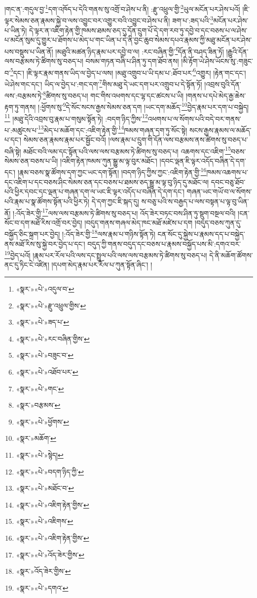 །གང་ན་:གདུལ་བྱ་\footnote{«སྣར་»«པེ་»འདུལ་བ་}དག་འཁོད་པ་དེའི་གནས་སུ་འགྲོ་བ་ཤེས་པ་ནི། :རྫུ་འཕྲུལ་གྱི་\footnote{«སྣར་»«པེ་»རྫུ་འཕྲུལ་གྱིས་}ཡུལ་མངོན་པར་ཤེས་པའོ། །ཇི་ལྟར་སེམས་ཅན་རྣམས་སྐྱེ་བ་ལས་འབྱུང་བར་འགྱུར་བའི་འབྱུང་བ་ཤེས་པ་ནི། ཟག་པ་:ཟད་པའི་\footnote{«སྣར་»«པེ་»ཟད་པ་}མངོན་པར་ཤེས་པ་ཡིན་ཏེ། དེ་ལྟར་ན་འཇིག་རྟེན་གྱི་ཁམས་ཐམས་ཅད་དུ་དོན་དྲུག་པོ་དེ་དག་རབ་ཏུ་དབྱེ་བ་དང་བཅས་པ་ལ་ཤེས་པ་མངོན་སུམ་དུ་གྱུར་པ་ཐོགས་པ་མེད་པ་གང་ཡིན་པ་དེ་ནི་བྱང་ཆུབ་སེམས་དཔའ་རྣམས་ཀྱི་མཐུ་མངོན་པར་ཤེས་པས་བསྡུས་པ་ཡིན་ནོ། །མཐུའི་མཚན་ཉིད་རྣམ་པར་དབྱེ་བ་ལ། :རང་བཞིན་གྱི་\footnote{«སྣར་»«པེ་»རང་བཞིན་གྱིས་}དོན་ནི་བཤད་ཟིན་ཏོ། །རྒྱུའི་དོན་ལས་བརྩམས་ཏེ་ཚིགས་སུ་བཅད་པ། བསམ་གཏན་བཞི་པ་ཤིན་ཏུ་དག་ཐོབ་ནས། །མི་རྟོག་ཡེ་ཤེས་ཡོངས་སུ་:གཟུང་བ་\footnote{«སྣར་»«པེ་»བཟུང་བ་}དང་། །ཇི་ལྟར་རྣམ་གནས་ཡིད་ལ་བྱེད་པ་ལས། །མཐུ་འགྲུབ་པ་ཡི་དམ་པ་:ཐོབ་པར་\footnote{«སྣར་»«པེ་»འཐོབ་པར་}འགྱུར། །རྟེན་གང་དང་། ཡེ་ཤེས་གང་དང་། ཡིད་ལ་བྱེད་པ་:གང་དག་\footnote{«སྣར་»«པེ་»གང་}གིས་མཐུ་དེ་ཡང་དག་པར་འགྲུབ་པ་དེ་སྟོན་ཏོ། །འབྲས་བུའི་དོན་ལས་:བརྩམས་ཏེ་\footnote{«སྣར་»བརྩམས་}ཚིགས་སུ་བཅད་པ། གང་གིས་འཕགས་དང་ལྷ་དང་ཚངས་པ་ཡི། །གནས་པ་དཔེ་མེད་རྒྱ་ཆེས་རྟག་ཏུ་གནས། །:ཕྱོགས་སུ་\footnote{«སྣར་»«པེ་»ཕྱོགས་}དེ་སོང་སངས་རྒྱས་སེམས་ཅན་དག །ཡང་དག་མཆོད་\footnote{«སྣར་»མཆོག་}བྱེད་རྣམ་པར་དག་པ་བསྐྱེད།\footnote{«སྣར་»«པེ་»སྙེད།} །མཐུ་དེའི་འབྲས་བུ་རྣམ་པ་གསུམ་སྟོན་ཏེ། :བདག་ཉིད་ཀྱིས་\footnote{«སྣར་»«པེ་»བདག་ཉིད་ཀྱི་}འཕགས་པ་ལ་སོགས་པའི་བདེ་བར་གནས་པ་:མཚུངས་པ་\footnote{«སྣར་»«པེ་»མཐོང་བ་}མེད་པ་མཆོག་དང་:འཇིག་རྟེན་གྱི་\footnote{«སྣར་»«པེ་»འཇིག་རྟེན་གྱིས་}ཁམས་གཞན་དག་ཏུ་སོང་སྟེ། སངས་རྒྱས་རྣམས་ལ་མཆོད་པ་དང་། སེམས་ཅན་རྣམས་རྣམ་པར་སྦྱོང་བའོ། །ལས་རྣམ་པ་དྲུག་གི་དོན་ལས་བརྩམས་ནས་ཚིགས་སུ་བཅད་པ་བཞི་སྟེ། མཐོང་བའི་ལམ་དང་སྟོན་པའི་ལས་ལས་བརྩམས་ཏེ་ཚིགས་སུ་བཅད་པ། འཆགས་དང་འཇིག་\footnote{«སྣར་»«པེ་»འཇིགས་}བཅས་སེམས་ཅན་བཅས་པ་ཡི། །འཇིག་རྟེན་ཁམས་ཀུན་སྒྱུ་མ་ལྟ་བུར་མཐོང་། །དབང་ལྡན་ཇི་ལྟར་འདོད་བཞིན་དེ་དག་དང་། །རྣམ་བཅས་སྣ་ཚོགས་དག་ཀྱང་ཡང་དག་སྟོན། །བདག་ཉིད་ཀྱིས་ཀྱང་:འཇིག་རྟེན་གྱི་\footnote{«སྣར་»«པེ་»འཇིག་རྟེན་གྱིས་}ཁམས་འཆགས་པ་དང་འཇིག་པ་དང་བཅས་ཤིང་སེམས་ཅན་དང་བཅས་པ་ཐམས་ཅད་སྒྱུ་མ་ལྟ་བུ་ཉིད་དུ་མཐོང་ལ། དབང་བཅུ་ཐོབ་པའི་ཕྱིར་དབང་དང་ལྡན་པ་གཞན་དག་ལ་ཡང་ཇི་ལྟར་འདོད་པ་བཞིན་དེ་དག་དང་། གཞན་ཡང་གཡོ་བ་ལ་སོགས་པའི་རྣམ་པ་སྣ་ཚོགས་སྟོན་པའི་ཕྱིར་ཏེ། དེ་དག་ཀྱང་ཇི་སྐད་དུ། ས་བཅུ་པའི་ས་བརྒྱད་པ་ལས་བསྟན་པ་ལྟ་བུ་ཡིན་ནོ། །:འོད་ཟེར་གྱི་\footnote{«སྣར་»«པེ་»འོད་ཟེར་གྱིས་}ལས་ལས་བརྩམས་ཏེ་ཚིགས་སུ་བཅད་པ། འོད་ཟེར་བཏང་བས་ཤིན་ཏུ་སྡུག་བསྔལ་བའི། །ངན་སོང་བ་དག་མཐོ་རིས་འགྲོ་བར་བྱེད། །བདུད་གནས་གཞལ་མེད་ཁང་མཐོ་མཛེས་པ་དག །བདུད་བཅས་ཀུན་དུ་བསྐྱོད་ཅིང་སྐྲག་པར་བྱེད། །:འོད་ཟེར་གྱི་\footnote{«སྣར་»འོད་ཟེར་གྱིས་}ལས་རྣམ་པ་གཉིས་སྟོན་ཏེ། ངན་སོང་དུ་སྐྱེས་པ་རྣམས་དད་པ་བསྐྱེད་ནས་མཐོ་རིས་སུ་སྐྱེ་བར་བྱེད་པ་དང་། བདུད་ཀྱི་གནས་བདུད་དང་བཅས་པ་རྣམས་བསྐྱོད་པས་མི་:དགའ་བར་\footnote{«སྣར་»«པེ་»དགའ་}བྱེད་པའོ། །རྣམ་པར་རོལ་པའི་ལས་དང་སྤྲུལ་པའི་ལས་ལས་བརྩམས་ཏེ་ཚིགས་སུ་བཅད་པ། དེ་ནི་མཆོག་ཚོགས་ནང་དུ་ཏིང་ངེ་འཛིན། །དཔག་མེད་རྣམ་པར་རོལ་པ་ཀུན་སྟོན་ཞིང་། །
